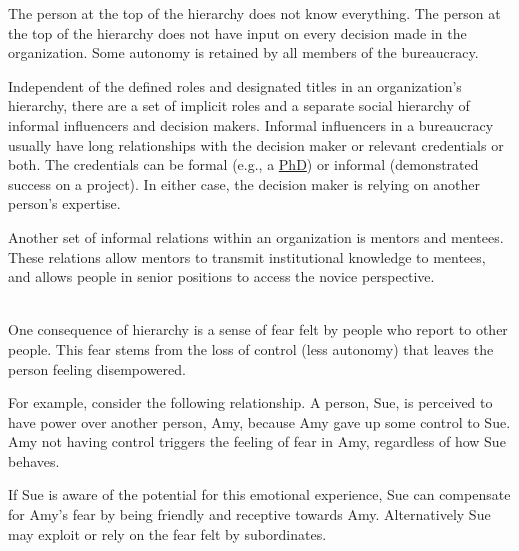 The person at the top of the hierarchy does not know everything. The person at the top of the hierarchy does not have input on every decision made in the organization. Some autonomy is retained by all members of the bureaucracy.

Independent of the defined roles and designated titles in an organization's hierarchy, there are a set of implicit roles and a separate social hierarchy of informal influencers and decision makers. Informal influencers in a bureaucracy usually have long relationships with the decision maker or relevant credentials or both. The credentials can be formal (e.g., a \href{https://en.wikipedia.org/wiki/Doctor_of_Philosophy}{PhD}) or informal (demonstrated success on a project). In either case, the decision maker is relying on another person's expertise. 

Another set of informal relations within an organization is mentors and mentees. These relations allow mentors to transmit institutional knowledge to mentees, and allows people in senior positions to access the novice perspective. 


\ \\

One consequence of hierarchy is a sense of fear felt by people who report to other people. This fear stems from the loss of control (less autonomy) that leaves the person feeling disempowered. 

For example, consider the following relationship. A person, Sue, is perceived to have power over another person, Amy, because Amy gave up some control to Sue. Amy not having control triggers the feeling of fear in Amy, regardless of how Sue behaves. 

If Sue is aware of the potential for this emotional experience, Sue can compensate for Amy's fear by being friendly and receptive towards Amy. Alternatively Sue may exploit or rely on the fear felt by subordinates. 




